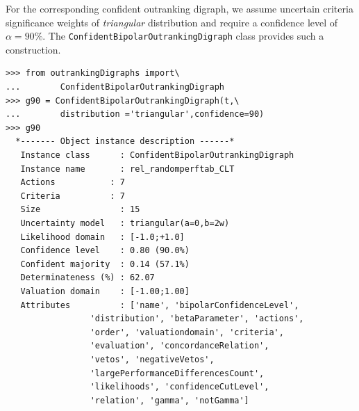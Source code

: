 For the corresponding confident outranking digraph, we assume uncertain criteria significance weights of \emph{triangular} distribution and require a confidence level of $\alpha = 90\%$. The \texttt{ConfidentBipolarOutrankingDigraph} class provides such a construction.
\begin{lstlisting}[caption={Computing a 90\% confident outranking dugraph},label=list:18.1]
>>> from outrankingDigraphs import\
...        ConfidentBipolarOutrankingDigraph   
>>> g90 = ConfidentBipolarOutrankingDigraph(t,\
...        distribution ='triangular',confidence=90)
>>> g90
  *------- Object instance description ------*
   Instance class      : ConfidentBipolarOutrankingDigraph
   Instance name       : rel_randomperftab_CLT
   Actions           : 7
   Criteria          : 7
   Size                : 15
   Uncertainty model   : triangular(a=0,b=2w)
   Likelihood domain   : [-1.0;+1.0]
   Confidence level    : 0.80 (90.0%)
   Confident majority  : 0.14 (57.1%)
   Determinateness (%) : 62.07
   Valuation domain    : [-1.00;1.00]
   Attributes          : ['name', 'bipolarConfidenceLevel',
                 'distribution', 'betaParameter', 'actions',
                 'order', 'valuationdomain', 'criteria',
                 'evaluation', 'concordanceRelation',
                 'vetos', 'negativeVetos',
                 'largePerformanceDifferencesCount',
                 'likelihoods', 'confidenceCutLevel',
                 'relation', 'gamma', 'notGamma']
\end{lstlisting}

